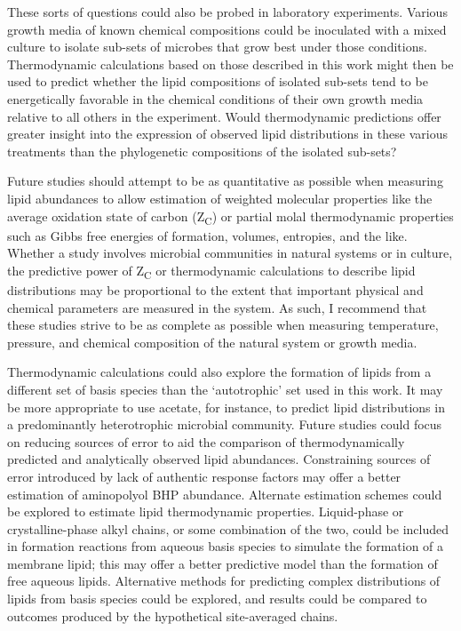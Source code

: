 These sorts of questions could also be probed in laboratory experiments. Various growth media of known chemical compositions could be inoculated with a mixed culture to isolate sub-sets of microbes that grow best under those conditions. Thermodynamic calculations based on those described in this work might then be used to predict whether the lipid compositions of isolated sub-sets tend to be energetically favorable in the chemical conditions of their own growth media relative to all others in the experiment. Would thermodynamic predictions offer greater insight into the expression of observed lipid distributions in these various treatments than the phylogenetic compositions of the isolated sub-sets?

Future studies should attempt to be as quantitative as possible when measuring lipid abundances to allow estimation of weighted molecular properties like the average oxidation state of carbon (Z\textsubscript{C}) or partial molal thermodynamic properties such as Gibbs free energies of formation, volumes, entropies, and the like. Whether a study involves microbial communities in natural systems or in culture, the predictive power of Z\textsubscript{C} or thermodynamic calculations to describe lipid distributions may be proportional to the extent that important physical and chemical parameters are measured in the system. As such, I recommend that these studies strive to be as complete as possible when measuring temperature, pressure, and chemical composition of the natural system or growth media.

Thermodynamic calculations could also explore the formation of lipids from a different set of basis species than the `autotrophic' set used in this work. It may be more appropriate to use acetate, for instance, to predict lipid distributions in a predominantly heterotrophic microbial community. Future studies could focus on reducing sources of error to aid the comparison of thermodynamically predicted and analytically observed lipid abundances. Constraining sources of error introduced by lack of authentic response factors may offer a better estimation of aminopolyol BHP abundance. Alternate estimation schemes could be explored to estimate lipid thermodynamic properties. Liquid-phase or crystalline-phase alkyl chains, or some combination of the two, could be included in formation reactions from aqueous basis species to simulate the formation of a membrane lipid; this may offer a better predictive model than the formation of free aqueous lipids. Alternative methods for predicting complex distributions of lipids from basis species could be explored, and results could be compared to outcomes produced by the hypothetical site-averaged chains.

